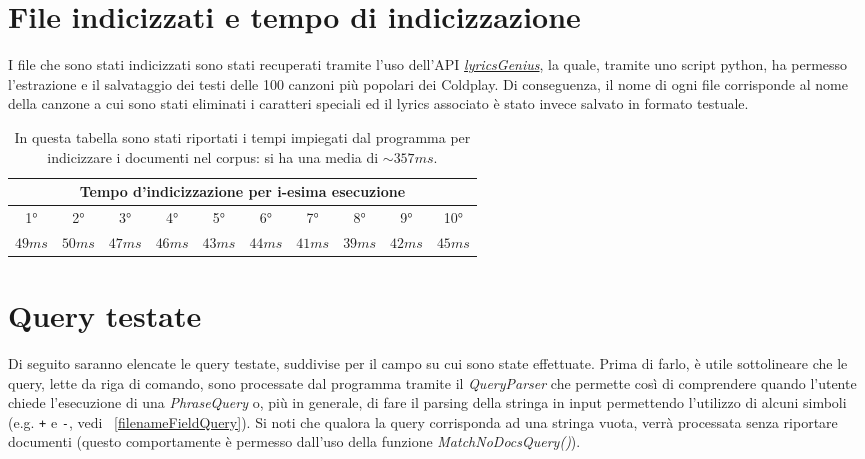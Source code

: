 \documentclass{article}
\begin{document}
\section{File indicizzati e tempo di indicizzazione}
I file che sono stati indicizzati sono stati recuperati tramite l'uso dell'API \href{https://lyricsgenius.readthedocs.io/en/master/}{\textit{lyricsGenius}}, la quale, tramite uno script python, ha permesso l'estrazione e il salvataggio dei testi delle 100 canzoni più popolari dei Coldplay. Di conseguenza, il nome di ogni file corrisponde al nome della canzone a cui sono stati eliminati i caratteri speciali ed il lyrics associato è stato invece salvato in formato testuale.
\begingroup
\setlength{\tabcolsep}{5pt} %
\renewcommand{\arraystretch}{1.5} %
\begin{center}
\begin{table}[h!]
    \begin{tabular}{|c|c|c|c|c|c|c|c|c|c|}
    \hline
    \multicolumn{10}{|c|}{Tempo d'indicizzazione per i-esima esecuzione}\\
    \hline
    1° & 2° & 3° & 4° & 5° & 6° & 7° & 8° & 9° & 10° \\
    \hline
        $49ms$ & $50ms$ & $47ms$ & $46ms$ & $43ms$ & $44ms$ & $41ms$ & $39ms$ & $42ms$ & $45ms$ \\
    \hline
    \end{tabular}
    \caption{In questa tabella sono stati riportati i tempi impiegati dal programma per indicizzare i documenti nel corpus: si ha una media di $\sim{357ms}$.}
\end{table}
\end{center}
\endgroup

\section{Query testate}
Di seguito saranno elencate le query testate, suddivise per il campo su cui sono state effettuate. Prima di farlo, è utile sottolineare che le query, lette da riga di comando, sono processate dal programma tramite il \textit{QueryParser} che permette così di comprendere quando l'utente chiede l'esecuzione di una \textit{PhraseQuery} o, più in generale, di fare il parsing della stringa in input permettendo l'utilizzo di alcuni simboli (e.g. \verb|+| e \verb|-|, vedi ~\ref{filenameFieldQuery}).
Si noti che qualora la query corrisponda ad una stringa vuota, verrà processata senza riportare documenti (questo comportamente è permesso dall'uso della funzione \textit{MatchNoDocsQuery()}).
\end{document}
